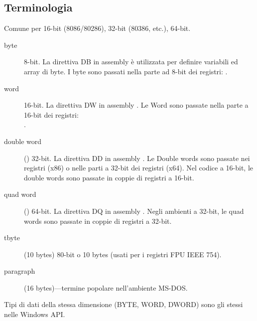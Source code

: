 
\subsection{Terminologia}

Comune per 16-bit (8086/80286), 32-bit (80386, etc.), 64-bit.

\begin{description}
	\item[byte] 8-bit.
		La direttiva DB in assembly è utilizzata per definire variabili ed array di byte.
		I byte sono passati nella parte ad 8-bit dei registri: .
	\item[word] 16-bit.
		La direttiva DW in assembly \dittoclosing.
		Le Word sono passate nella parte a 16-bit dei registri:\\
			.
	\item[double word] () 32-bit.
		La direttiva DD in assembly \dittoclosing.
		Le Double words sono passate nei registri (x86) o nelle parti a 32-bit dei registri (x64).
		Nel codice a 16-bit, le double words sono passate in coppie di registri a 16-bit.
	\item[quad word] () 64-bit.
		La direttiva DQ in assembly \dittoclosing.
		Negli ambienti a 32-bit, le quad words sono passate in coppie di registri a 32-bit.
	\item[tbyte] (10 bytes) 80-bit o 10 bytes (usati per i registri FPU IEEE 754).
	\item[paragraph] (16 bytes)---termine popolare nell'ambiente MS-DOS. %
\end{description}


Tipi di dati della stessa dimensione (BYTE, WORD, DWORD) sono gli stessi nelle Windows \ac{API}.

